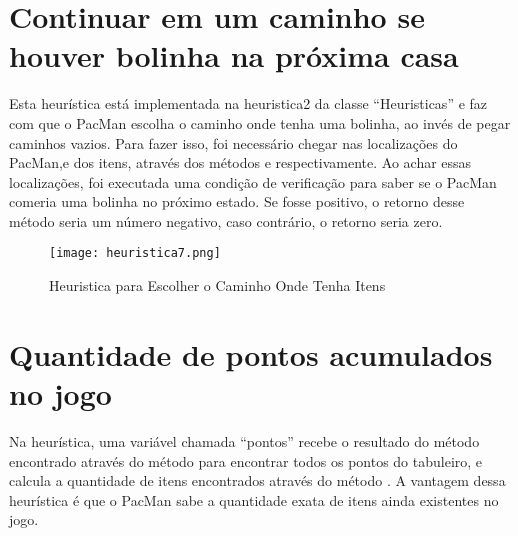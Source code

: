 \documentclass[12pt, a4paper, english, brazil]{abntex2}
\begin{document}
    \section{Continuar em um caminho se houver bolinha na próxima casa}
    Esta heurística está implementada na heuristica2 da classe “Heuristicas” e faz com que o PacMan escolha o caminho onde tenha uma bolinha, ao invés de pegar  caminhos vazios. Para fazer  isso, foi necessário chegar nas  localizações do PacMan,e dos itens, através dos métodos  e  respectivamente. Ao achar essas localizações, foi executada uma condição de verificação para saber se o PacMan comeria uma bolinha no próximo estado. Se fosse positivo, o retorno desse método seria um número negativo, caso contrário, o retorno seria zero. 

\begin{figure}[H]
\centering
\caption{Heuristica para Escolher o Caminho Onde Tenha Itens}
\texttt{[image: heuristica7.png]}
\label{fig:heuristica7}
\end{figure}   


    \section{Quantidade de pontos acumulados no jogo}
 Na heurística, uma variável chamada “pontos” recebe o resultado do método  encontrado através do método  para encontrar todos os pontos do tabuleiro, e calcula a quantidade de itens encontrados através do método . A vantagem dessa heurística é que o PacMan sabe a quantidade exata de itens ainda existentes no jogo.
\end{document}
